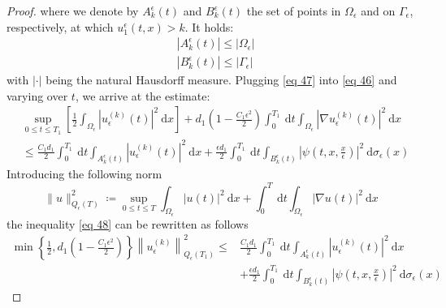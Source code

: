 \begin{proof}
where we denote by $A_{k}^{\epsilon}(t)$ and $B_{k}^{\epsilon}(t)$ the set of points in $\Omega_{\epsilon}$ and on $\Gamma_{\epsilon}$, respectively, at which $u_{1}^{\epsilon}(t, x)>k$. It holds:
$$
\begin{aligned}
&\left|A_{k}^{\epsilon}(t)\right| \leq\left|\Omega_{\epsilon}\right| \\
&\left|B_{k}^{\epsilon}(t)\right| \leq\left|\Gamma_{\epsilon}\right|
\end{aligned}
$$
with $|\cdot|$ being the natural Hausdorff measure.
Plugging \eqref{eq 47} into \eqref{eq 46} and varying over $t$, we arrive at the estimate: 
\begin{equation}
  \begin{aligned}
&\sup _{0 \leq t \leq T_{1}}\left[\frac{1}{2} \int_{\Omega_{\epsilon}}\left|u_{\epsilon}^{(k)}(t)\right|^{2} \mathrm{~d} x\right]+d_{1}\left(1-\frac{C_{1} \epsilon^{2}}{2}\right) \int_{0}^{T_{1}} \mathrm{~d} t \int_{\Omega_{\epsilon}}\left|\nabla u_{\epsilon}^{(k)}(t)\right|^{2} \mathrm{~d} x \\
&\leq \frac{C_{1} d_{1}}{2} \int_{0}^{T_{1}} \mathrm{~d} t \int_{A_{k}^{\epsilon}(t)}\left|u_{\epsilon}^{(k)}(t)\right|^{2} \mathrm{~d} x+\frac{\epsilon d_{1}}{2} \int_{0}^{T_{1}} \mathrm{~d} t \int_{B_{k}^{\epsilon}(t)}\left|\psi\left(t, x, \frac{x}{\epsilon}\right)\right|^{2} \mathrm{~d} \sigma_{\epsilon}(x)
\end{aligned}
\label{eq 48}\end{equation}
Introducing the following norm
\begin{equation}
  \|u\|_{Q_{\epsilon}(T)}^{2}\coloneqq \sup _{0 \leq t \leq T} \int_{\Omega_{\epsilon}}|u(t)|^{2} \mathrm{~d} x+\int_{0}^{T} \mathrm{~d} t \int_{\Omega_{\epsilon}}|\nabla u(t)|^{2} \mathrm{~d} x
\label{eq 49}\end{equation}
the inequality \eqref{eq 48} can be rewritten as follows
\begin{equation}
  \begin{aligned}
\min \left\{\frac{1}{2}, d_{1}\left(1-\frac{C_{1} \epsilon^{2}}{2}\right)\right\}\left\|u_{\epsilon}^{(k)}\right\|_{Q_{\epsilon}\left(T_{1}\right)}^{2} \leq & \frac{C_{1} d_{1}}{2} \int_{0}^{T_{1}} \mathrm{~d} t \int_{A_{k}^{\epsilon}(t)}\left|u_{\epsilon}^{(k)}(t)\right|^{2} \mathrm{~d} x \\
&+\frac{\epsilon d_{1}}{2} \int_{0}^{T_{1}} \mathrm{~d} t \int_{B_{k}^{\epsilon}(t)}\left|\psi\left(t, x, \frac{x}{\epsilon}\right)\right|^{2} \mathrm{~d} \sigma_{\epsilon}(x)

\end{aligned}
\end{equation}
\end{proof}
